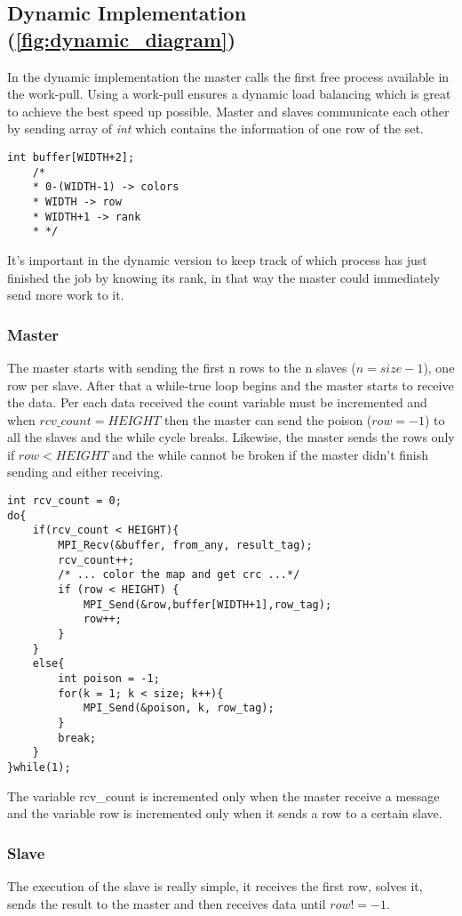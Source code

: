 \documentclass[11pt,conference]{IEEEtran}
\begin{document}
\subsection{Dynamic Implementation (\ref{fig:dynamic_diagram})}
In the dynamic implementation the master calls the first free process available in the work-pull. Using a work-pull ensures a dynamic load balancing which is great to achieve the best speed up possible. Master and slaves communicate each other by sending array of \textit{int} which contains the information of one row of the set.

\begin{lstlisting}
int buffer[WIDTH+2];
	/*
	* 0-(WIDTH-1) -> colors
	* WIDTH -> row
	* WIDTH+1 -> rank
	* */
\end{lstlisting}

It's important in the dynamic version to keep track of which process has just finished the job by knowing its rank, in that way the master could immediately send more work to it.

\subsubsection{\textbf{Master}}
The master starts with sending the first n rows to the n slaves ($n = size-1$), one row per slave. After that a while-true loop begins and the master starts to receive the data. Per each data received the count variable must be incremented and when $rcv\_count = HEIGHT$ then the master can send the poison ($row = -1$) to all the slaves and the while cycle breaks. Likewise, the master sends the rows only if $row < HEIGHT$ and the while cannot be broken if the master didn't finish sending and either receiving.
\begin{lstlisting}
int rcv_count = 0;
do{
	if(rcv_count < HEIGHT){
		MPI_Recv(&buffer, from_any, result_tag);
		rcv_count++;
		/* ... color the map and get crc ...*/
		if (row < HEIGHT) {
			MPI_Send(&row,buffer[WIDTH+1],row_tag);
			row++;
		}
	}
	else{
		int poison = -1;
		for(k = 1; k < size; k++){
			MPI_Send(&poison, k, row_tag);
		}
		break;
	}
}while(1);
\end{lstlisting}
The variable rcv\_count is incremented only when the master receive a message and the variable row is incremented only when it sends a row to a certain slave.


\subsubsection{\textbf{Slave}}
The execution of the slave is really simple, it receives the first row, solves it, sends the result to the master and then receives data until $row != -1$.
\end{document}
